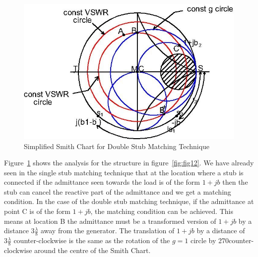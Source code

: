 \begin{figure}[h]
\centering
\includegraphics[width=1\linewidth]{./graphics/dousmith}
\caption{Simplified Smith Chart for Double Stub Matching Technique}
\label{fig:dousmith}
\end{figure}

Figure~\ref{fig:dousmith} shows the analysis for the structure in figure~\ref{fig:fig12}. We have already seen in the single stub matching technique that at the location where a stub is connected if the admittance seen towards the load is of the form $1 +jb$ then the stub can cancel the reactive part of the admittance and we get a matching condition. In the case of the double stub matching technique, if the admittance at point C is of the form $1 + jb$, the matching condition can be achieved. This means at location B the admittance must be a transformed version of $1 + jb$ by a distance $3\frac{\lambda}{8}$ away from the generator. The translation of $1 + jb$ by a distance of $3\frac{\lambda}{8}$ counter-clockwise is the same as the rotation of the $g = 1$ circle by 270\textdegree counter-clockwise around the centre of the Smith Chart.

